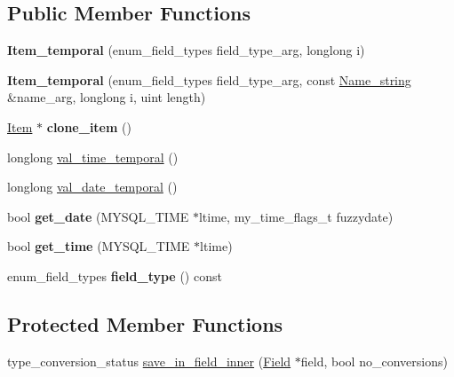\subsection*{Public Member Functions}
\begin{DoxyCompactItemize}
\item 
\mbox{\label{classItem__temporal_acd57b2e9e1c06ac8b0e856034b2211d4}} 
{\bfseries Item\+\_\+temporal} (enum\+\_\+field\+\_\+types field\+\_\+type\+\_\+arg, longlong i)
\item 
\mbox{\label{classItem__temporal_a83dc8bac703d65b8947d6e3efaa426f2}} 
{\bfseries Item\+\_\+temporal} (enum\+\_\+field\+\_\+types field\+\_\+type\+\_\+arg, const \mbox{\hyperlink{className__string}{Name\+\_\+string}} \&name\+\_\+arg, longlong i, uint length)
\item 
\mbox{\label{classItem__temporal_a9bc031fb62aebf24a532def2660b74e8}} 
\mbox{\hyperlink{classItem}{Item}} $\ast$ {\bfseries clone\+\_\+item} ()
\item 
longlong \mbox{\hyperlink{classItem__temporal_ac5adb00cf4d1f565f7b858bef7c0a968}{val\+\_\+time\+\_\+temporal}} ()
\item 
longlong \mbox{\hyperlink{classItem__temporal_a3af452477612ee734dbee3b4b206b14f}{val\+\_\+date\+\_\+temporal}} ()
\item 
\mbox{\label{classItem__temporal_a0ba433ceb5577ec364c80b5fd89967ed}} 
bool {\bfseries get\+\_\+date} (M\+Y\+S\+Q\+L\+\_\+\+T\+I\+ME $\ast$ltime, my\+\_\+time\+\_\+flags\+\_\+t fuzzydate)
\item 
\mbox{\label{classItem__temporal_a8b3bbcf86981d26976ca08a2e292461b}} 
bool {\bfseries get\+\_\+time} (M\+Y\+S\+Q\+L\+\_\+\+T\+I\+ME $\ast$ltime)
\item 
\mbox{\label{classItem__temporal_a8f2b8f8c3723b2ffb086ca33cf3fe68f}} 
enum\+\_\+field\+\_\+types {\bfseries field\+\_\+type} () const
\end{DoxyCompactItemize}
\subsection*{Protected Member Functions}
\begin{DoxyCompactItemize}
\item 
type\+\_\+conversion\+\_\+status \mbox{\hyperlink{classItem__temporal_a12c4888e99d5a236550023180ec4f400}{save\+\_\+in\+\_\+field\+\_\+inner}} (\mbox{\hyperlink{classField}{Field}} $\ast$field, bool no\+\_\+conversions)
\end{DoxyCompactItemize}
